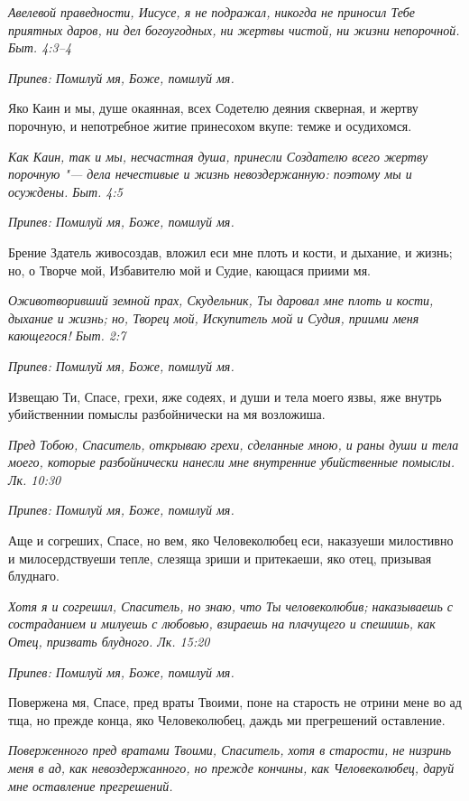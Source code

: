 \itshape Авелевой праведности, Иисусе, я не подражал, никогда не приносил Тебе приятных даров, ни дел богоугодных, ни жертвы чистой, ни жизни непорочной. Быт. 4:3–4\normalfont{}


\itshape Припев:\normalfont{} Помилуй мя, Боже, помилуй мя.


Яко Каин и мы, душе окаянная, всех Содетелю деяния скверная, и жертву порочную, и непотребное житие принесохом вкупе: темже и осудихомся.


\itshape Как Каин, так и мы, несчастная душа, принесли Создателю всего жертву порочную "--- дела нечестивые и жизнь невоздержанную: поэтому мы и осуждены. Быт. 4:5\normalfont{}


\itshape Припев:\normalfont{} Помилуй мя, Боже, помилуй мя.


Брение Здатель живосоздав, вложил еси мне плоть и кости, и дыхание, и жизнь; но, о Творче мой, Избавителю мой и Судие, кающася приими мя.


\itshape Оживотворивший земной прах, Скудельник, Ты даровал мне плоть и кости, дыхание и жизнь; но, Творец мой, Искупитель мой и Судия, приими меня кающегося! Быт. 2:7\normalfont{}


\itshape Припев:\normalfont{} Помилуй мя, Боже, помилуй мя.


Извещаю Ти, Спасе, грехи, яже содеях, и души и тела моего язвы, яже внутрь убийственнии помыслы разбойнически на мя возложиша.


\itshape Пред Тобою, Спаситель, открываю грехи, сделанные мною, и раны души и тела моего, которые разбойнически нанесли мне внутренние убийственные помыслы. Лк. 10:30\normalfont{}


\itshape Припев:\normalfont{} Помилуй мя, Боже, помилуй мя.


Аще и согреших, Спасе, но вем, яко Человеколюбец еси, наказуеши милостивно и милосердствуеши тепле, слезяща зриши и притекаеши, яко отец, призывая блуднаго.


\itshape Хотя я и согрешил, Спаситель, но знаю, что Ты человеколюбив; наказываешь с состраданием и милуешь с любовью, взираешь на плачущего и спешишь, как Отец, призвать блудного. Лк. 15:20\normalfont{}


\itshape Припев:\normalfont{} Помилуй мя, Боже, помилуй мя.


Повержена мя, Спасе, пред враты Твоими, поне на старость не отрини мене во ад тща, но прежде конца, яко Человеколюбец, даждь ми прегрешений оставление.


\itshape Поверженного пред вратами Твоими, Спаситель, хотя в старости, не низринь меня в ад, как невоздержанного, но прежде кончины, как Человеколюбец, даруй мне оставление прегрешений.\normalfont{}


